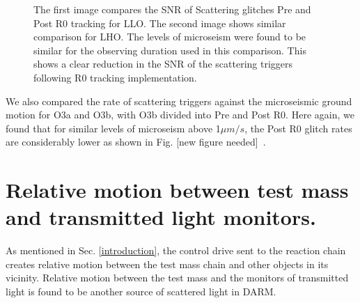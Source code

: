 \documentclass[12pt]{iopart}
\begin{document}
\begin{figure}[h]
    
    
    \caption{The first image compares the SNR of Scattering glitches Pre and Post R0 tracking for LLO. The second image shows similar comparison for LHO. The levels of microseism were found to be similar for the observing duration used in this comparison. This shows a clear reduction in the SNR of the scattering triggers following R0 tracking implementation. } %
    \label{fig:postr0_scat}
    
\end{figure}
We also compared the rate of scattering triggers against the microseismic ground motion for O3a and O3b, with O3b divided into Pre and Post R0. Here again, we found that for similar levels of microseism above 1${\mu}m/s$, the Post R0 glitch rates are considerably lower as shown in Fig. [new figure needed]~\cite{alog_corey}.


\vspace{2cm}
\section{Relative motion between test mass and transmitted light monitors.} \label{transmon_scattering}
As mentioned in Sec. \ref{introduction}, the control drive sent to the reaction chain creates relative motion between the test mass chain and other objects in its vicinity. Relative motion between the test mass and the monitors of transmitted light is found to be another source of scattered light in DARM.
\par
\end{document}
